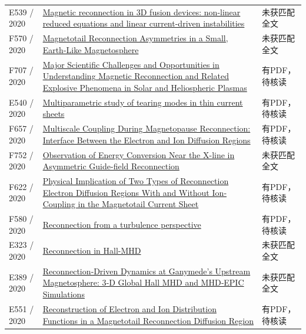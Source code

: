 \documentclass[UTF8,a4paper,11pt,openany,fontset=fandol]{ctexbook}
\begin{document}
\begin{longtable}{P{24mm}P{97mm}P{27mm}}
E539 / 2020 & \href{https://doi.org/10.1088/1361-6587/abcab3}{Magnetic reconnection in 3D fusion devices: non-linear reduced equations and linear current-driven instabilities} & 未获匹配全文\\

F570 / 2020 & \href{https://doi.org/10.1002/essoar.10504213.1}{Magnetotail Reconnection Asymmetries in a Small,  Earth-Like Magnetosphere} & 未获匹配全文\\

F707 / 2020 & \href{https://doi.org/10.48550/arxiv.2009.08779}{Major Scientific Challenges and Opportunities in Understanding Magnetic Reconnection and Related Explosive Phenomena in Solar and Heliospheric Plasmas} & 有PDF，待核读\\

E540 / 2020 & \href{https://doi.org/10.1063/5.0022133}{Multiparametric study of tearing modes in thin current sheets} & 有PDF，待核读\\

F657 / 2020 & \href{https://doi.org/10.1029/2020ja027985}{Multiscale Coupling During Magnetopause Reconnection: Interface Between the Electron and Ion Diffusion Regions} & 有PDF，待核读\\

F752 / 2020 & \href{https://doi.org/10.3847/2041-8213/ab8e31}{Observation of Energy Conversion Near the X-line in Asymmetric Guide-field Reconnection} & 未获匹配全文\\

F622 / 2020 & \href{https://doi.org/10.1029/2020gl088761}{Physical Implication of Two Types of Reconnection Electron Diffusion Regions With and Without Ion‐Coupling in the Magnetotail Current Sheet} & 有PDF，待核读\\

F580 / 2020 & \href{https://doi.org/10.1063/1.5128376}{Reconnection from a turbulence perspective} & 有PDF，待核读\\

E323 / 2020 & \href{http://absimage.aps.org/image/DPP20/MWS_DPP20-2020-001941.pdf}{Reconnection in Hall-MHD} & 未获匹配全文\\

E389 / 2020 & \href{https://doi.org/10.1029/2020ja028162}{Reconnection‐Driven Dynamics at Ganymede's Upstream Magnetosphere: 3‐D Global Hall MHD and MHD‐EPIC Simulations} & 未获匹配全文\\

E551 / 2020 & \href{https://doi.org/10.1029/2020ja027879}{Reconstruction of Electron and Ion Distribution Functions in a Magnetotail Reconnection Diffusion Region} & 有PDF，待核读\\


\end{longtable}
\end{document}
